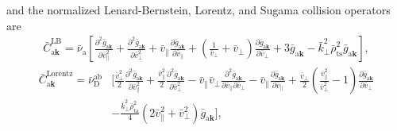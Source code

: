 and the normalized Lenard-Bernstein, Lorentz, and Sugama collision operators are
\begin{align}
  \bar{C}_{\mathrm{a}\bm{k}}^\mathrm{LB} = \bar{\nu}_\mathrm{a} \left[ \frac{\partial^2 \bar{g}_{\mathrm{a}\bm{k}}}{\partial \bar{v}_\parallel^2} + \frac{\partial^2 \bar{g}_{\mathrm{a}\bm{k}}}{\partial \bar{v}_\perp^2} + \bar{v}_\parallel \frac{\partial \bar{g}_{\mathrm{a}\bm{k}}}{\partial \bar{v}_\parallel} + \left(\frac{1}{\bar{v}_\perp} + \bar{v}_\perp \right) \frac{\partial \bar{g}_{\mathrm{a}\bm{k}}}{\partial \bar{v}_\perp} + 3 \bar{g}_{\mathrm{a}\bm{k}} - \bar{k}_\perp^2\bar{\rho}_\mathrm{ts}^2 \bar{g}_{\mathrm{a}\bm{k}} \right],
\end{align}
\begin{align}
  \bar{C}_{\mathrm{a}\bm{k}}^\mathrm{Lorentz} = \bar{\nu}_\mathrm{D}^\mathrm{ab} &\Bigg[ \frac{\bar{v}_\perp^2}{2} \frac{\partial^2 \bar{g}_{\mathrm{a}\bm{k}}}{\partial \bar{v}_\parallel^2} + \frac{\bar{v}_\parallel^2}{2} \frac{\partial^2 \bar{g}_{\mathrm{a}\bm{k}}}{\partial \bar{v}_\perp^2} - \bar{v}_\parallel \bar{v}_\perp  \frac{\partial^2 \bar{g}_{\mathrm{a}\bm{k}}}{\partial \bar{v}_\parallel \partial \bar{v}_\perp} - \bar{v}_\parallel \frac{\partial \bar{g}_{\mathrm{a}\bm{k}}}{\partial \bar{v}_\parallel} + \frac{\bar{v}_\perp}{2} \left(\frac{\bar{v}_\parallel^2}{\bar{v}_\perp^2} - 1 \right) \frac{\partial \bar{g}_{\mathrm{a}\bm{k}}}{\partial \bar{v}_\perp} \nonumber \\
  &- \frac{\bar{k}_\perp^2\bar{\rho}_\mathrm{ta}^2}{4} (2\bar{v}_\parallel^2+\bar{v}_\perp^2) \bar{g}_{\mathrm{a}\bm{k}} \Bigg],
\end{align}
